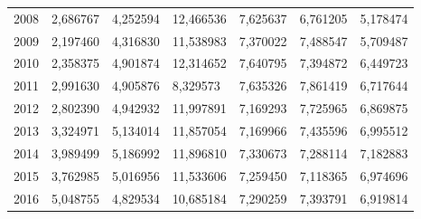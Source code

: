\begin{table}
\begin{tabular}{p{1cm}p{2cm}p{2cm}p{2cm}p{2cm}p{2cm}p{2cm}}
 2008 &                                     2,686767 &                                    4,252594 &                            12,466536 &                                      7,625637 &                         6,761205 & 5,178474 \\
 2009 &                                     2,197460 &                                    4,316830 &                            11,538983 &                                      7,370022 &                         7,488547 & 5,709487 \\
 2010 &                                     2,358375 &                                    4,901874 &                            12,314652 &                                      7,640795 &                         7,394872 & 6,449723 \\
 2011 &                                     2,991630 &                                    4,905876 &                             8,329573 &                                      7,635326 &                         7,861419 & 6,717644 \\
 2012 &                                     2,802390 &                                    4,942932 &                            11,997891 &                                      7,169293 &                         7,725965 & 6,869875 \\
 2013 &                                     3,324971 &                                    5,134014 &                            11,857054 &                                      7,169966 &                         7,435596 & 6,995512 \\
 2014 &                                     3,989499 &                                    5,186992 &                            11,896810 &                                      7,330673 &                         7,288114 & 7,182883 \\
 2015 &                                     3,762985 &                                    5,016956 &                            11,533606 &                                      7,259450 &                         7,118365 & 6,974696 \\
 2016 &                                     5,048755 &                                    4,829534 &                            10,685184 &                                      7,290259 &                         7,393791 & 6,919814 \\
\bottomrule
\end{tabular}
\end{table}
